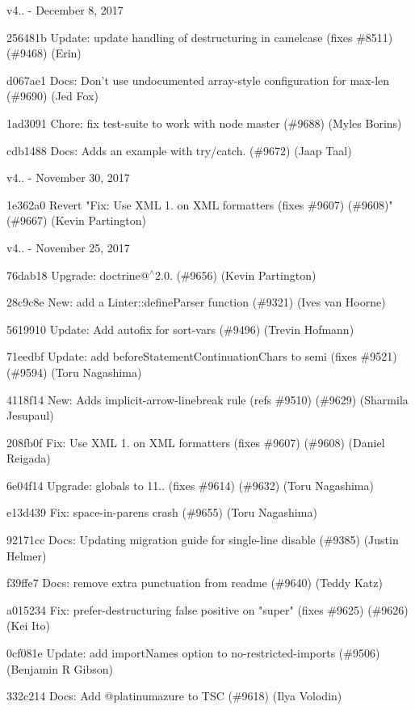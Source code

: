 v4.. -\/ December 8, 2017


\begin{DoxyItemize}
\item 256481b Update\+: update handling of destructuring in camelcase (fixes \#8511) (\#9468) (Erin)
\item d067ae1 Docs\+: Don’t use undocumented array-\/style configuration for max-\/len (\#9690) (Jed Fox)
\item 1ad3091 Chore\+: fix test-\/suite to work with node master (\#9688) (Myles Borins)
\item cdb1488 Docs\+: Adds an example with try/catch. (\#9672) (Jaap Taal)
\end{DoxyItemize}

v4.. -\/ November 30, 2017


\begin{DoxyItemize}
\item 1e362a0 Revert "{}\+Fix\+: Use XML 1. on XML formatters (fixes \#9607) (\#9608)"{} (\#9667) (Kevin Partington)
\end{DoxyItemize}

v4.. -\/ November 25, 2017


\begin{DoxyItemize}
\item 76dab18 Upgrade\+: doctrine@\texorpdfstring{$^\wedge$}{\string^}2.0. (\#9656) (Kevin Partington)
\item 28c9c8e New\+: add a Linter\+::define\+Parser function (\#9321) (Ives van Hoorne)
\item 5619910 Update\+: Add autofix for {\ttfamily sort-\/vars} (\#9496) (Trevin Hofmann)
\item 71eedbf Update\+: add {\ttfamily before\+Statement\+Continuation\+Chars} to semi (fixes \#9521) (\#9594) (Toru Nagashima)
\item 4118f14 New\+: Adds implicit-\/arrow-\/linebreak rule (refs \#9510) (\#9629) (Sharmila Jesupaul)
\item 208fb0f Fix\+: Use XML 1. on XML formatters (fixes \#9607) (\#9608) (Daniel Reigada)
\item 6e04f14 Upgrade\+: {\ttfamily globals} to 11.. (fixes \#9614) (\#9632) (Toru Nagashima)
\item e13d439 Fix\+: space-\/in-\/parens crash (\#9655) (Toru Nagashima)
\item 92171cc Docs\+: Updating migration guide for single-\/line disable (\#9385) (Justin Helmer)
\item f39ffe7 Docs\+: remove extra punctuation from readme (\#9640) (Teddy Katz)
\item a015234 Fix\+: prefer-\/destructuring false positive on "{}super"{} (fixes \#9625) (\#9626) (Kei Ito)
\item 0cf081e Update\+: add import\+Names option to no-\/restricted-\/imports (\#9506) (Benjamin R Gibson)
\item 332c214 Docs\+: Add @platinumazure to TSC (\#9618) (Ilya Volodin)
\end{DoxyItemize}

